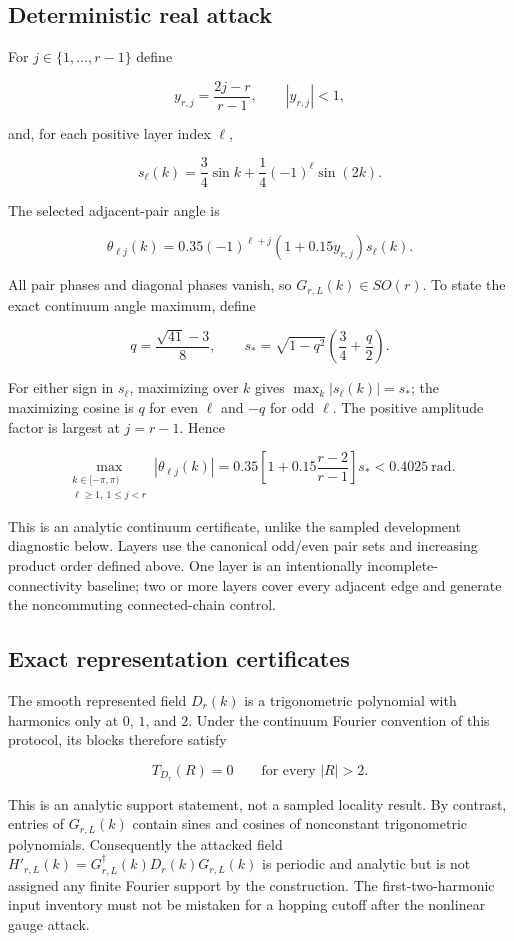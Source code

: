 \documentclass[11pt]{article}
\begin{document}
\subsection{Deterministic real attack}

For $j\in\{1,\ldots,r-1\}$ define

\[
y_{r,j}=\frac{2j-r}{r-1},
\qquad |y_{r,j}|<1,
\]

and, for each positive layer index $\ell$,

\[
s_\ell(k)=\frac34\sin k+\frac14(-1)^\ell\sin(2k).
\]

The selected adjacent-pair angle is

\[
\theta_{\ell j}(k)=0.35(-1)^{\ell+j}
\left(1+0.15y_{r,j}\right)s_\ell(k).
\]

All pair phases and diagonal phases vanish, so
$G_{r,L}(k)\in SO(r)$. To state the exact continuum angle maximum, define

\[
q=\frac{\sqrt{41}-3}{8},
\qquad
s_*=\sqrt{1-q^2}\left(\frac34+\frac q2\right).
\]

For either sign in $s_\ell$, maximizing over $k$ gives $\max_k|s_\ell(k)|=s_*$;
the maximizing cosine is $q$ for even $\ell$ and $-q$ for odd $\ell$. The positive
amplitude factor is largest at $j=r-1$. Hence

\[
\max_{\substack{k\in[-\pi,\pi)\\ \ell\geq1,\ 1\leq j<r}}
|\theta_{\ell j}(k)|
=0.35\left[1+0.15\frac{r-2}{r-1}\right]s_*<0.4025\ \mathrm{rad}.
\]

This is an analytic continuum certificate, unlike the sampled development diagnostic
below. Layers use the canonical odd/even pair sets and increasing product order defined
above. One layer is an intentionally incomplete-connectivity baseline; two or more
layers cover every adjacent edge and generate the noncommuting connected-chain control.

\subsection{Exact representation certificates}

The smooth represented field $D_r(k)$ is a trigonometric polynomial with harmonics only
at $0$, $1$, and $2$. Under the continuum Fourier convention of this protocol, its
blocks therefore satisfy

\[
T_{D_r}(R)=0\qquad\text{for every }|R|>2.
\]

This is an analytic support statement, not a sampled locality result. By contrast,
entries of $G_{r,L}(k)$ contain sines and cosines of nonconstant trigonometric
polynomials. Consequently the attacked field
$H'_{r,L}(k)=G_{r,L}^{\dagger}(k)D_r(k)G_{r,L}(k)$ is periodic and analytic but is not
assigned any finite Fourier support by the construction. The first-two-harmonic input
inventory must not be mistaken for a hopping cutoff after the nonlinear gauge attack.
\end{document}
